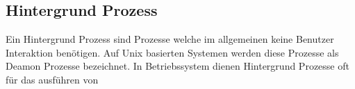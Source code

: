 \subsection{Hintergrund Prozess}

Ein Hintergrund Prozess sind Prozesse welche im allgemeinen keine Benutzer Interaktion benötigen. Auf Unix basierten Systemen werden diese Prozesse als Deamon Prozesse bezeichnet. In Betriebssystem dienen Hintergrund Prozesse oft für das ausführen von 
